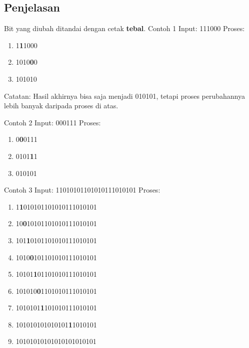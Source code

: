 \documentclass{article}
\begin{document}
\subsection*{Penjelasan}
Bit yang diubah ditandai dengan cetak \textbf{tebal}.
\newline \newline
Contoh 1\newline
Input: 111000\newline
Proses:
\begin{enumerate}
 \item 1\textbf{1}1000
 \item 1010\textbf{0}0
 \item 101010
\end{enumerate}
Catatan: Hasil akhirnya bisa saja menjadi 010101, tetapi proses perubahannya lebih banyak daripada proses di atas.\newline

Contoh 2\newline
Input: 000111\newline
Proses:
\begin{enumerate}
 \item 0\textbf{0}0111
 \item 0101\textbf{1}1
 \item 010101
\end{enumerate}

Contoh 3\newline
Input: 11010101101010111010101\newline
Proses:
\begin{enumerate}
 \item 1\textbf{1}010101101010111010101
 \item 10\textbf{0}10101101010111010101
 \item 101\textbf{1}0101101010111010101 
 \item 1010\textbf{0}101101010111010101
 \item 10101\textbf{1}01101010111010101
 \item 101010\textbf{0}1101010111010101
 \item 1010101\textbf{1}101010111010101
 \item 101010101010101\textbf{1}1010101
 \item 10101010101010101010101
\end{enumerate}
\end{document}

